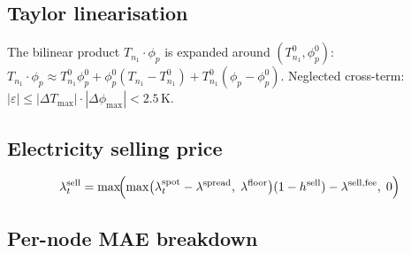 \documentclass[a4paper,fleqn]{cas-dc}
\begin{document}
\subsection{Taylor linearisation}
\label{app:taylor_derivation}

The bilinear product $T_{n_1} \cdot \phi_p$ is expanded around
$(T_{n_1}^0, \phi_p^0)$:
$T_{n_1} \cdot \phi_p \approx T_{n_1}^0 \phi_p^0
+ \phi_p^0 (T_{n_1} - T_{n_1}^0)
+ T_{n_1}^0 (\phi_p - \phi_p^0)$.
Neglected cross-term:
$|\varepsilon| \leq |\Delta T_{\max}| \cdot |\Delta\phi_{\max}|
< 2.5\,$K.

\subsection{Electricity selling price}
\label{app:selling_price}

\vspace{-4pt}
\begin{equation}
  \lambda_t^{\mathrm{sell}} = \max\!\Bigl(
    \max\bigl(\lambda_t^{\mathrm{spot}}
      - \lambda^{\mathrm{spread}},\;
      \lambda^{\mathrm{floor}}\bigr)
    (1 - h^{\mathrm{sell}})
    - \lambda^{\mathrm{sell,fee}},\; 0\Bigr)
\end{equation}

\subsection{Per-node MAE breakdown}
\label{app:per_node_mae}
\end{document}
